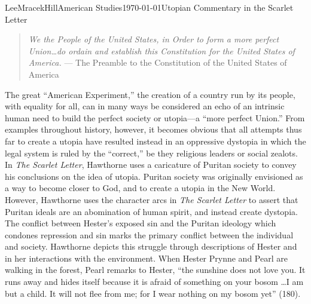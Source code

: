 \documentclass[12pt, letterpaper]{article}
\begin{document}
\begin{mla}{Lee}{Mracek}{Hill}{American Studies}{\today}{Utopian Commentary in the Scarlet Letter}
\begin{quotation}
\textit{We the People of the United States, in Order to form a more perfect Union\ldots do ordain and establish this Constitution for the United States of America.} --- The Preamble to the Constitution of the United States of America
\end{quotation}
        \par The great ``American Experiment,'' the creation of a country run by its people, with equality for all, can in many ways be considered an echo of an intrinsic human need to build the perfect society or utopia---a ``more perfect Union.'' From examples throughout history, however, it becomes obvious that all attempts thus far to create a utopia have resulted instead in an oppressive dystopia in which the legal system is ruled by the ``correct,'' be they religious leaders or social zealots. In \textit{The Scarlet Letter}, Hawthorne uses a caricature of Puritan society to convey his conclusions on the idea of utopia. Puritan society was originally envisioned as a way to become closer to God, and to create a utopia in the New World. However, Hawthorne uses the character arcs in \textit{The Scarlet Letter} to assert that Puritan ideals are an abomination of human spirit, and instead create dystopia. \\
        The conflict between Hester’s exposed sin and the Puritan ideology which condones repression and sin marks the primary conflict between the individual and society. Hawthorne depicts this struggle through descriptions of Hester and in her interactions with the environment. When Hester Prynne and Pearl are walking in the forest, Pearl remarks to Hester, ``the sunshine does not love you. It runs away and hides itself because it is afraid of something on your bosom \ldots I am but a child. It will not flee from me; for I wear nothing on my bosom yet'' (180).

\end{mla}
\end{document}
